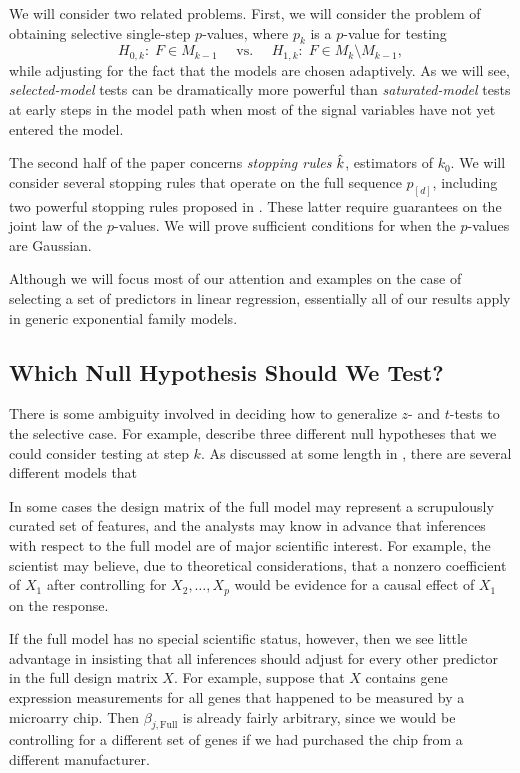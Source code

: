 \documentclass{article}
\begin{document}
We will consider two related problems. First, we will consider the problem of obtaining selective single-step $p$-values, where $p_k$ is a $p$-value for testing
\[
H_{0,k}:\; F\in M_{k-1}\quad \text{ vs. } \quad 
H_{1,k}:\; F\in M_k\setminus M_{k-1},
\]
while adjusting for the fact that the models are chosen adaptively. As we will see, {\em selected-model} tests can be dramatically more powerful than {\em saturated-model} tests at early steps in the model path when most of the signal variables have not yet entered the model.

The second half of the paper concerns {\em stopping rules} $\hat{k}$, estimators of $k_0$. We will consider several stopping rules that operate on the full sequence $p_{[d]}$, including two powerful stopping rules proposed in \citet{gsell2013sequential}. These latter require guarantees on the joint law of the $p$-values. We will prove sufficient conditions for when the $p$-values are Gaussian.

Although we will focus most of our attention and examples on the case of selecting a set of predictors in linear regression, essentially all of our results apply in generic exponential family models.

\subsection{Which Null Hypothesis Should We Test?}

There is some ambiguity involved in deciding how to generalize $z$- and $t$-tests to the selective case. For example, \citet{gsell2013sequential} describe three different null hypotheses that we could consider testing at step $k$. As discussed at some length in \citet{fithian2014optimal}, there are several different models that 

In some cases the design matrix of the full model may represent a  scrupulously curated set of features, and the analysts may know in advance that inferences with respect to the full model are of major scientific interest. For example, the scientist may believe, due to theoretical considerations, that a nonzero coefficient of $X_1$ after controlling for $X_2,\ldots,X_p$ would be evidence for a causal effect of $X_1$ on the response.

If the full model has no special scientific status, however, then we see little advantage in insisting that all inferences should adjust for every other predictor in the full design matrix $X$. For example, suppose that $X$ contains gene expression measurements for all genes that happened to be measured by a microarry chip. Then $\beta_{j,\text{Full}}$ is already fairly arbitrary, since we would be controlling for a different set of genes if we had purchased the chip from a different manufacturer.
\end{document}
